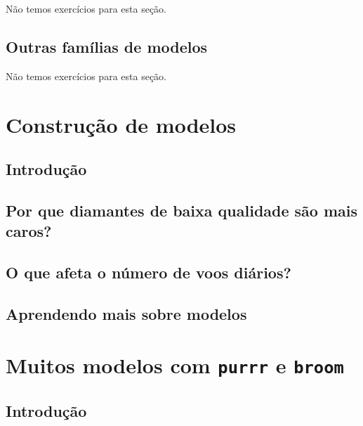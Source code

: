 \documentclass[
]{latex/krantz}
\theoremstyle{definition}
\theoremstyle{definition}
\theoremstyle{definition}
\theoremstyle{definition}
\theoremstyle{remark}
\begin{document}
Não temos exercícios para esta seção.

\hypertarget{outras-famuxedlias-de-modelos}{%
\section{Outras famílias de modelos}\label{outras-famuxedlias-de-modelos}}

Não temos exercícios para esta seção.

\hypertarget{construuxe7uxe3o-de-modelos}{%
\chapter{Construção de modelos}\label{construuxe7uxe3o-de-modelos}}

\hypertarget{introduuxe7uxe3o-15}{%
\section{Introdução}\label{introduuxe7uxe3o-15}}

\hypertarget{por-que-diamantes-de-baixa-qualidade-suxe3o-mais-caros}{%
\section{Por que diamantes de baixa qualidade são mais caros?}\label{por-que-diamantes-de-baixa-qualidade-suxe3o-mais-caros}}

\hypertarget{o-que-afeta-o-nuxfamero-de-voos-diuxe1rios}{%
\section{O que afeta o número de voos diários?}\label{o-que-afeta-o-nuxfamero-de-voos-diuxe1rios}}

\hypertarget{aprendendo-mais-sobre-modelos}{%
\section{Aprendendo mais sobre modelos}\label{aprendendo-mais-sobre-modelos}}

\hypertarget{muitos-modelos-com-purrr-e-broom}{%
\chapter{\texorpdfstring{Muitos modelos com \texttt{purrr} e \texttt{broom}}{Muitos modelos com purrr e broom}}\label{muitos-modelos-com-purrr-e-broom}}

\hypertarget{introduuxe7uxe3o-16}{%
\section{Introdução}\label{introduuxe7uxe3o-16}}
\end{document}
